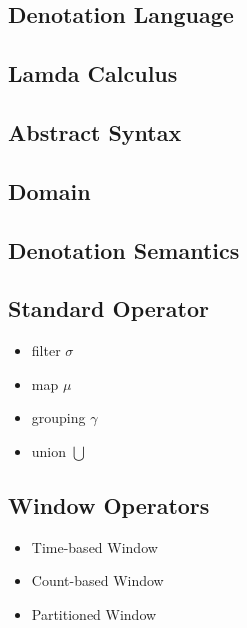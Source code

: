 \subsection*{Denotation Language}
\subsection*{Lamda Calculus}

\subsection{Abstract Syntax}


\subsection{Domain}

\subsection{Denotation Semantics}








\subsection{Standard Operator}
\begin{itemize}
	\item filter $\sigma$
	\item map $\mu$
	\item grouping $\gamma$  
	\item union $\bigcup$
\end{itemize}

\subsection{Window Operators}
\begin{itemize}
\item Time-based Window
\item Count-based Window
\item Partitioned Window
\end{itemize}



